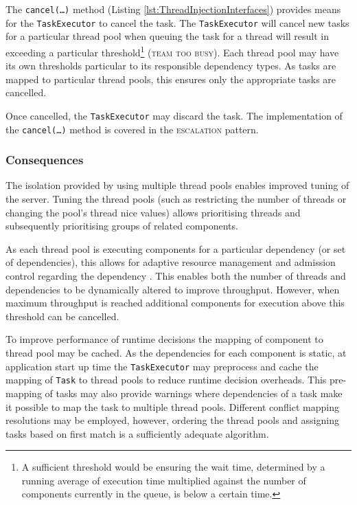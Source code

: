 \documentclass[prodmode]{style/acmlarge}
\begin{document}
The \texttt{cancel(\ldots)} method (Listing \ref{lst:ThreadInjectionInterfaces})
provides means for the \texttt{TaskExecutor} to cancel the task.
The \texttt{TaskExecutor} will cancel new tasks for a particular thread pool
when queuing the task for a thread will result in exceeding a particular
threshold\footnote{A sufficient threshold would be ensuring the wait time,
determined by a running average of execution time multiplied against the number
of components currently in the queue, is below a certain time.} (\textsc{team
too busy}).  Each thread pool may have its own thresholds particular to its
responsible dependency types.  As tasks are mapped to particular thread pools,
this ensures only the appropriate tasks are cancelled.

Once cancelled, the \texttt{TaskExecutor} may discard the task.  The
implementation of the \texttt{can\-cel(\ldots)} method is covered in the
\textsc{escalation} pattern.


\subsubsection*{Consequences}

The isolation provided by using multiple thread pools enables improved tuning of
the server.  Tuning the thread pools (such as restricting the number of threads
or changing the pool's thread nice values) allows prioritising threads and
subsequently prioritising groups of related components.

As each thread pool is executing components for a particular dependency (or set
of dependencies), this allows for adaptive resource management and admission
control regarding the dependency \cite{seda}.  This enables both the number of
threads and dependencies to be dynamically altered to improve throughput.
However, when maximum throughput is reached additional components for execution
above this threshold can be cancelled.

To improve performance of runtime decisions the mapping of component to thread
pool may be cached.  As the dependencies for each component is static, at
application start up time the \texttt{TaskExecutor} may preprocess and
cache the mapping of \texttt{Task} to thread pools to reduce runtime
decision overheads.  This pre-mapping of tasks may also provide warnings
where dependencies of a task make it possible to map the task to
multiple thread pools.  Different conflict mapping resolutions may be employed,
however, ordering the thread pools and assigning tasks based on first match
is a sufficiently adequate algorithm.
\end{document}
